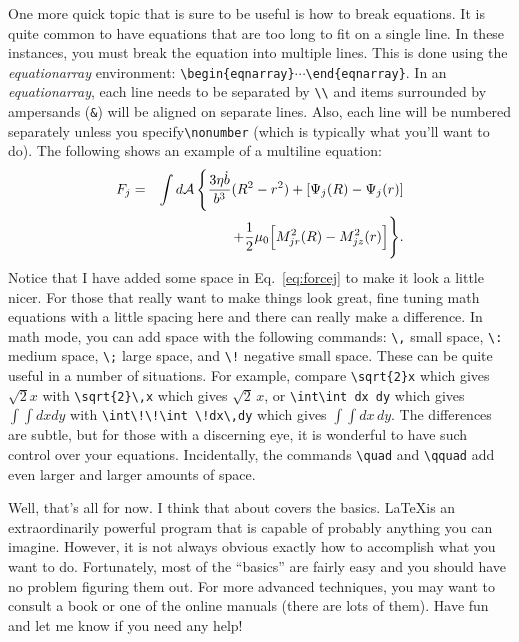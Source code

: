 \documentclass[preprint,pre,floats,aps,amsmath,amssymb]{revtex4}
\begin{document}
One more quick topic that is sure to be useful is how to break
equations.  It is quite common to have equations that are too long to
fit on a single line.  In these instances, you must break the equation
into multiple lines.  This is done using the \textit{equationarray}
environment: \verb!\begin{eqnarray}!$\cdots$\verb!\end{eqnarray}!.  In
an \textit{equationarray}, each line needs to be separated by
\verb!\\! and items surrounded by ampersands (\verb!&!) will be
aligned on separate lines.  Also, each line will be numbered
separately unless you specify\verb!\nonumber! (which is typically what
you'll want to do).  The following shows an example of a multiline
equation:
\begin{eqnarray}
F_{j} &=& \int d {\cal A}\, \Biggl\{ \frac{3\eta \dot{b}}{b^3}
(R^2 - r^2) + [\Psi_j(R) - \Psi_j(r)] \nonumber \\
&\ &\qquad\qquad + \frac{1}{2}\mu_0 \Bigl[ M_{jr}^2(R) -
M_{jz}^2(r) \Bigr] \Biggr\}.
\label{eq:forcej}
\end{eqnarray}
Notice that I have added some space in Eq.~\ref{eq:forcej} to make it
look a little nicer.  For those that really want to make things look
great, fine tuning math equations with a little spacing here and there
can really make a difference.  In math mode, you can add space with
the following commands: \verb!\,! small space, \verb!\:! medium space,
\verb!\;! large space, and \verb&\!& negative small space.  These can
be quite useful in a number of situations.  For example, compare
\verb!\sqrt{2}x! which gives $\sqrt{2}x$ with \verb!\sqrt{2}\,x! which
gives $\sqrt{2}\,x$, or \verb!\int\int dx dy! which gives $\int\int dx
dy$ with \verb&\int\!\!\int \!dx\,dy& which gives $\int\!\!\int
\!dx\,dy$. The differences are subtle, but for those with a discerning
eye, it is wonderful to have such control over your equations. 
Incidentally, the commands \verb!\quad! and \verb!\qquad! add even
larger and larger amounts of space.

Well, that's all for now.  I think that about covers the basics. 
\LaTeX is an extraordinarily powerful program that is capable of
probably anything you can imagine.  However, it is not always obvious
exactly how to accomplish what you want to do.  Fortunately, most of
the ``basics'' are fairly easy and you should have no problem figuring
them out.  For more advanced techniques, you may want to consult a
book or one of the online manuals (there are lots of them).  Have fun
and let me know if you need any help!
\end{document}
